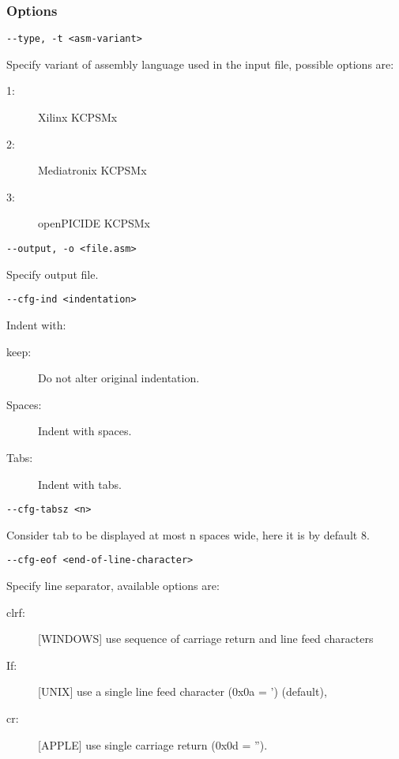             \subsubsection{Options}
                {
                \usecodefont

                \verb'--type, -t <asm-variant>'\\
                }
                Specify variant of assembly language used in the input file, possible options are:
                \begin{description}
                  \item [1:] Xilinx KCPSMx
                  \item [2:] Mediatronix KCPSMx
                  \item [3:] openPICIDE KCPSMx
                \end{description}
                {
                \usecodefont

                \verb'--output, -o <file.asm>'\\
                }
                Specify output file.
                {
                \usecodefont

                \verb'--cfg-ind <indentation>'\\
                }
                Indent with:
                \begin{description}
                 \item [keep:] Do not alter original indentation.
                 \item [Spaces:] Indent with spaces.
                 \item [Tabs:] Indent with tabs.
                \end{description}
                {
                \usecodefont

                \verb'--cfg-tabsz <n>'\\
                }
                Consider tab to be displayed at most n spaces wide, here it is by default 8.
                {
                \usecodefont

                \verb'--cfg-eof <end-of-line-character>'\\
                }
                Specify line separator, available options are:
                \begin{description}
                  \item [clrf:] [WINDOWS] use sequence of carriage return and line feed characters
                  \item [If:] [UNIX] use a single line feed character (0x0a = ') (default),
                  \item [cr:] [APPLE] use single carriage return (0x0d = '').
                \end{description}
